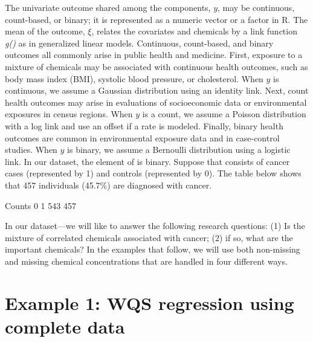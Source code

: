 The univariate outcome shared among the components, \(y\), may be
continuous, count-based, or binary; it is represented as a numeric
vector or a factor in R. The mean of the outcome, \(\xi\), relates the
covariates and chemicals by a link function \emph{g()} as in generalized
linear models. Continuous, count-based, and binary outcomes all commonly
arise in public health and medicine. First, exposure to a mixture of
chemicals may be associated with continuous health outcomes, such as
body mass index (BMI), systolic blood pressure, or cholesterol. When
\(y\) is continuous, we assume a Gaussian distribution using an identity
link. Next, count health outcomes may arise in evaluations of
socioeconomic data or environmental exposures in census regions. When
\(y\) is a count, we assume a Poisson distribution with a log link and
use an offset if a rate is modeled. Finally, binary health outcomes are
common in environmental exposure data and in case-control studies. When
\(y\) is binary, we assume a Bernoulli distribution using a logistic
link. In our dataset, the  element of 
is binary. Suppose that  consists of cancer cases
(represented by 1) and controls (represented by 0). The table below
shows that 457 individuals (45.7\%) are diagnosed with cancer.

\begin{Schunk}
\begin{Soutput}
Counts
  0   1 
543 457 
\end{Soutput}
\end{Schunk}

In our dataset----we will like to answer the following
research questions: (1) Is the mixture of correlated chemicals
associated with cancer; (2) if so, what are the important chemicals? In
the examples that follow, we will use both non-missing and missing
chemical concentrations that are handled in four different ways.

\hypertarget{example-1-wqs-regression-using-complete-data}{%
\section{Example 1: WQS regression using complete
data}\label{example-1-wqs-regression-using-complete-data}}

